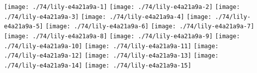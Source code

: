 \texttt{[image: ./74/lily-e4a21a9a-1]}%
\ifx\betweenLilyPondSystem \undefined
  \linebreak
\else
  \expandafter{}%
\fi
\texttt{[image: ./74/lily-e4a21a9a-2]}%
\ifx\betweenLilyPondSystem \undefined
  \linebreak
\else
  \expandafter{}%
\fi
\texttt{[image: ./74/lily-e4a21a9a-3]}%
\ifx\betweenLilyPondSystem \undefined
  \linebreak
\else
  \expandafter{}%
\fi
\texttt{[image: ./74/lily-e4a21a9a-4]}%
\ifx\betweenLilyPondSystem \undefined
  \linebreak
\else
  \expandafter{}%
\fi
\texttt{[image: ./74/lily-e4a21a9a-5]}%
\ifx\betweenLilyPondSystem \undefined
  \linebreak
\else
  \expandafter{}%
\fi
\texttt{[image: ./74/lily-e4a21a9a-6]}%
\ifx\betweenLilyPondSystem \undefined
  \linebreak
\else
  \expandafter{}%
\fi
\texttt{[image: ./74/lily-e4a21a9a-7]}%
\ifx\betweenLilyPondSystem \undefined
  \linebreak
\else
  \expandafter{}%
\fi
\texttt{[image: ./74/lily-e4a21a9a-8]}%
\ifx\betweenLilyPondSystem \undefined
  \linebreak
\else
  \expandafter{}%
\fi
\texttt{[image: ./74/lily-e4a21a9a-9]}%
\ifx\betweenLilyPondSystem \undefined
  \linebreak
\else
  \expandafter{}%
\fi
\texttt{[image: ./74/lily-e4a21a9a-10]}%
\ifx\betweenLilyPondSystem \undefined
  \linebreak
\else
  \expandafter{}%
\fi
\texttt{[image: ./74/lily-e4a21a9a-11]}%
\ifx\betweenLilyPondSystem \undefined
  \linebreak
\else
  \expandafter{}%
\fi
\texttt{[image: ./74/lily-e4a21a9a-12]}%
\ifx\betweenLilyPondSystem \undefined
  \linebreak
\else
  \expandafter{}%
\fi
\texttt{[image: ./74/lily-e4a21a9a-13]}%
\ifx\betweenLilyPondSystem \undefined
  \linebreak
\else
  \expandafter{}%
\fi
\texttt{[image: ./74/lily-e4a21a9a-14]}%
\ifx\betweenLilyPondSystem \undefined
  \linebreak
\else
  \expandafter{}%
\fi
\texttt{[image: ./74/lily-e4a21a9a-15]}%
\ifx\betweenLilyPondSystem \undefined
